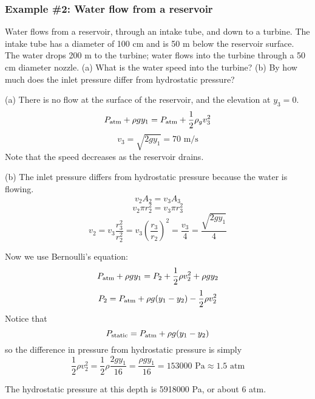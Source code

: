 \subsubsection{Example \#2: Water flow from a reservoir}
Water flows from a reservoir, through an intake tube, and down to a turbine. The intake tube has a diameter of 100 cm and is 50 m below the reservoir surface. The water drops 200 m to the turbine; water flows into the turbine through a 50 cm diameter nozzle. (a) What is the water speed into the turbine? (b) By how much does the inlet pressure differ from hydrostatic pressure?

(a) There is no flow at the surface of the reservoir, and the elevation at $y_3=0$. 
$$P_{\rm atm}+\rho g y_1=P_{\rm atm}+\frac{1}{2}\rho_g v_3^2$$
$$v_3=\sqrt{2gy_1}=70\mbox{ m/s}$$
Note that the speed decreases as the reservoir drains.

(b) The inlet pressure differs from hydrostatic pressure because the water is flowing. 
$$v_2A_2=v_3A_3$$
$$v_2\pi r_2^2=v_3\pi r_3^2$$
$$v_2=v_3\frac{r_3^2}{r_2^2}=v_3\left(\frac{r_3}{r_2}\right)^2=\frac{v_3}{4}=\frac{\sqrt{2gy_1}}{4}$$

Now we use Bernoulli's equation:
$$P_{\rm atm}+\rho g y_1=P_2+\frac{1}{2}\rho v_2^2+\rho g y_2$$
$$P_2=P_{\rm atm}+\rho g(y_1-y_2)-\frac{1}{2}\rho v_2^2$$
Notice that
$$P_{\rm static}=P_{\rm atm}+\rho g(y_1-y_2)$$
so the difference in pressure from hydrostatic pressure is simply
$$\frac{1}{2}\rho v_2^2=\frac{1}{2}\rho\frac{2gy_1}{16}=\frac{\rho gy_1}{16}=153000\mbox{ Pa}\approx 1.5\mbox{ atm}$$

The hydrostatic pressure at this depth is 5918000 Pa, or about 6 atm.



\clearpage
